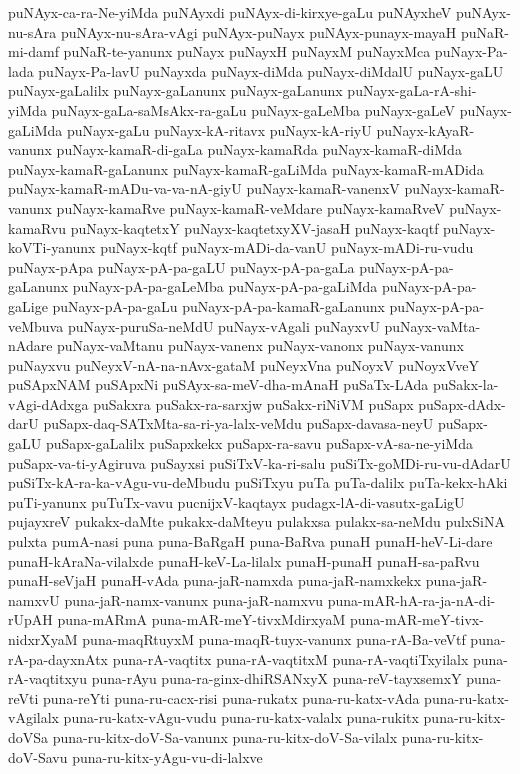 {puNAyx-ca-ra-Ne-yiMda
puNAyxdi
puNAyx-di-kirxye-gaLu
puNAyxheV
puNAyx-nu-sAra
puNAyx-nu-sAra-vAgi
puNAyx-puNayx
puNAyx-punayx-mayaH
puNaR-mi-damf
puNaR-te-yanunx
puNayx
puNayxH
puNayxM
puNayxMca
puNayx-Pa-lada
puNayx-Pa-lavU
puNayxda
puNayx-diMda
puNayx-diMdalU
puNayx-gaLU
puNayx-gaLalilx
puNayx-gaLanunx
puNayx-gaLanunx
puNayx-gaLa-rA-shi-yiMda
puNayx-gaLa-saMsAkx-ra-gaLu
puNayx-gaLeMba
puNayx-gaLeV
puNayx-gaLiMda
puNayx-gaLu
puNayx-kA-ritavx
puNayx-kA-riyU
puNayx-kAyaR-vanunx
puNayx-kamaR-di-gaLa
puNayx-kamaRda
puNayx-kamaR-diMda
puNayx-kamaR-gaLanunx
puNayx-kamaR-gaLiMda
puNayx-kamaR-mADida
puNayx-kamaR-mADu-va-va-nA-giyU
puNayx-kamaR-vanenxV
puNayx-kamaR-vanunx
puNayx-kamaRve
puNayx-kamaR-veMdare
puNayx-kamaRveV
puNayx-kamaRvu
puNayx-kaqtetxY
puNayx-kaqtetxyXV-jasaH
puNayx-kaqtf
puNayx-koVTi-yanunx
puNayx-kqtf
puNayx-mADi-da-vanU
puNayx-mADi-ru-vudu
puNayx-pApa
puNayx-pA-pa-gaLU
puNayx-pA-pa-gaLa
puNayx-pA-pa-gaLanunx
puNayx-pA-pa-gaLeMba
puNayx-pA-pa-gaLiMda
puNayx-pA-pa-gaLige
puNayx-pA-pa-gaLu
puNayx-pA-pa-kamaR-gaLanunx
puNayx-pA-pa-veMbuva
puNayx-puruSa-neMdU
puNayx-vAgali
puNayxvU
puNayx-vaMta-nAdare
puNayx-vaMtanu
puNayx-vanenx
puNayx-vanonx
puNayx-vanunx
puNayxvu
puNeyxV-nA-na-nAvx-gataM
puNeyxVna
puNoyxV
puNoyxVveY
puSApxNAM
puSApxNi
puSAyx-sa-meV-dha-mAnaH
puSaTx-LAda
puSakx-la-vAgi-dAdxga
puSakxra
puSakx-ra-sarxjw
puSakx-riNiVM
puSapx
puSapx-dAdx-darU
puSapx-daq-SATxMta-sa-ri-ya-lalx-veMdu
puSapx-davasa-neyU
puSapx-gaLU
puSapx-gaLalilx
puSapxkekx
puSapx-ra-savu
puSapx-vA-sa-ne-yiMda
puSapx-va-ti-yAgiruva
puSayxsi
puSiTxV-ka-ri-salu
puSiTx-goMDi-ru-vu-dAdarU
puSiTx-kA-ra-ka-vAgu-vu-deMbudu
puSiTxyu
puTa
puTa-dalilx
puTa-kekx-hAki
puTi-yanunx
puTuTx-vavu
pucnijxV-kaqtayx
pudagx-lA-di-vasutx-gaLigU
pujayxreV
pukakx-daMte
pukakx-daMteyu
pulakxsa
pulakx-sa-neMdu
pulxSiNA
pulxta
pumA-nasi
puna
puna-BaRgaH
puna-BaRva
punaH
punaH-heV-Li-dare
punaH-kAraNa-vilalxde
punaH-keV-La-lilalx
punaH-punaH
punaH-sa-paRvu
punaH-seVjaH
punaH-vAda
puna-jaR-namxda
puna-jaR-namxkekx
puna-jaR-namxvU
puna-jaR-namx-vanunx
puna-jaR-namxvu
puna-mAR-hA-ra-ja-nA-di-rUpAH
puna-mARmA
puna-mAR-meY-tivxMdirxyaM
puna-mAR-meY-tivx-nidxrXyaM
puna-maqRtuyxM
puna-maqR-tuyx-vanunx
puna-rA-Ba-veVtf
puna-rA-pa-dayxnAtx
puna-rA-vaqtitx
puna-rA-vaqtitxM
puna-rA-vaqtiTxyilalx
puna-rA-vaqtitxyu
puna-rAyu
puna-ra-ginx-dhiRSANxyX
puna-reV-tayxsemxY
puna-reVti
puna-reYti
puna-ru-cacx-risi
puna-rukatx
puna-ru-katx-vAda
puna-ru-katx-vAgilalx
puna-ru-katx-vAgu-vudu
puna-ru-katx-valalx
puna-rukitx
puna-ru-kitx-doVSa
puna-ru-kitx-doV-Sa-vanunx
puna-ru-kitx-doV-Sa-vilalx
puna-ru-kitx-doV-Savu
puna-ru-kitx-yAgu-vu-di-lalxve
}
